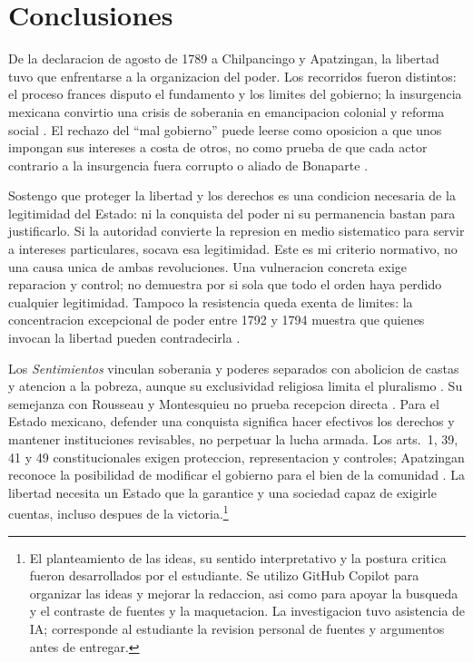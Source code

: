 \documentclass[spanish,letterpaper,oneside]{article}
\begin{document}
\clearpage
\section{Conclusiones}

De la declaracion de agosto de 1789 a Chilpancingo y Apatzingan,
la libertad tuvo que enfrentarse a la organizacion del poder.
Los recorridos fueron distintos: el proceso frances disputo el
fundamento y los limites del gobierno; la insurgencia mexicana
convirtio una crisis de soberania en emancipacion colonial y reforma
social \citep{francia1789,agnPrimo2020,morelos2020}.
El rechazo del ``mal gobierno'' puede leerse como oposicion a que
unos impongan sus intereses a costa de otros, no como prueba de
que cada actor contrario a la insurgencia fuera corrupto o aliado
de Bonaparte \citep[p.~209]{martinezBaez2021}.

Sostengo que proteger la libertad y los derechos es una condicion
necesaria de la legitimidad del Estado: ni la conquista del poder
ni su permanencia bastan para justificarlo. Si la autoridad convierte
la represion en medio sistematico para servir a intereses particulares,
socava esa legitimidad. Este es mi criterio normativo, no una causa
unica de ambas revoluciones. Una vulneracion concreta exige reparacion
y control; no demuestra por si sola que todo el orden haya perdido
cualquier legitimidad. Tampoco la resistencia queda exenta de limites:
la concentracion excepcional de poder entre 1792 y 1794 muestra que
quienes invocan la libertad pueden contradecirla
\citep{garciaRicci2011,ansuategui2013}
\citep[pp.~280--283]{kriele2022}.

Los \emph{Sentimientos} vinculan soberania y poderes separados con
abolicion de castas y atencion a la pobreza, aunque su exclusividad
religiosa limita el pluralismo \citep[nums.~2, 5, 6, 12 y 15]{morelos2020}.
Su semejanza con Rousseau y Montesquieu no prueba recepcion directa
\citep{rousseau1999,montesquieuSinFecha}. Para el Estado mexicano,
defender una conquista significa hacer efectivos los derechos y
mantener instituciones revisables, no perpetuar la lucha armada.
Los arts.~1, 39, 41 y 49 constitucionales exigen proteccion,
representacion y controles; Apatzingan reconoce la posibilidad de
modificar el gobierno para el bien de la comunidad
\citep{cpeum2026S2}\citep[art.~4]{congresoApatzingan2021}.
La libertad necesita un Estado que la garantice y una sociedad
capaz de exigirle cuentas, incluso despues de la victoria.\footnote{El
planteamiento de las ideas, su sentido interpretativo y la postura
critica fueron desarrollados por el estudiante. Se utilizo GitHub
Copilot para organizar las ideas y mejorar la redaccion, asi como
para apoyar la busqueda y el contraste de fuentes y la maquetacion.
La investigacion tuvo asistencia de IA; corresponde al estudiante
la revision personal de fuentes y argumentos antes de entregar.}
\end{document}
